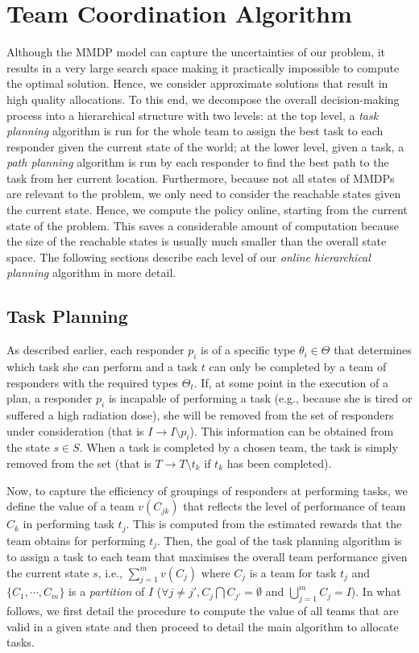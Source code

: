 \section{Team Coordination Algorithm}
\label{sec:algo}
Although the MMDP model can capture the uncertainties of our
problem, it results in a very large search space making it
practically impossible to compute the optimal solution. Hence, we consider approximate solutions that result in
high quality allocations. To this end, we decompose the overall
decision-making process into a hierarchical structure with two
levels: at the top level, a {\em task planning} algorithm is run
for the whole team to assign the best task to each responder given
the current state of the world; at the lower level, given a task, a
{\em path planning} algorithm is run by each responder to find the
best path to the task from her current location. Furthermore,
because not all states of MMDPs are relevant to the problem, we
only need to consider the reachable states given the current state.
Hence, we compute the policy online, starting from the current state
of the problem. This saves a considerable amount of computation
because the size of the reachable states is usually much smaller
than the overall state space. The following sections describe each
level of our {\em online hierarchical planning} algorithm in more
detail.

\subsection{Task Planning} \label{sec:taskplanning} As described earlier, each responder $p_i$ is of a specific type
$\theta_i \in \Theta$ that determines which task she can perform
and  a task $t$ can only be completed by a team of responders with
the required types $\Theta_t$. If, at some point in the execution
of a plan, a responder $p_i$ is incapable of performing a task
(e.g., because she is tired or suffered a high radiation dose), she
will be removed from the set of responders under consideration
(that is $I \to I \setminus p_i$). This information can be obtained
from the state $s \in S$. When a task is completed by a chosen
team, the task is simply removed from the set (that is $T \to
T\setminus t_k$ if $t_k$ has been completed).

Now, to capture the efficiency of groupings of responders at
performing tasks, we define the value of a team $v(C_{jk})$ that
reflects the level of performance of team $C_k$ in performing task
$t_j$. This is computed from the estimated rewards that the team
obtains for performing $t_j$.  Then, the goal of the task planning
algorithm is to assign a task to each team that maximises the
overall team performance given the current state $s$, i.e.,
$\sum_{j=1}^m v(C_{j})$ where $C_j$ is a team for task $t_j$ and
$\{ C_1, \cdots, C_m \}$ is a {\em partition} of $I$ ($\forall
j\neq j', C_j \bigcap C_{j'} = \emptyset$ and $\bigcup_{j=1}^m
C_j=I$). In what follows, we first detail the procedure to compute
the value of all teams that are valid in a given state and then
proceed to detail the main algorithm to allocate tasks.


